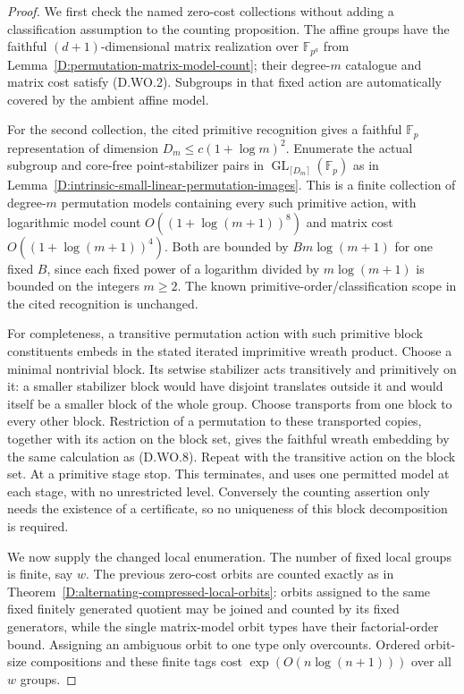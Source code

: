 \begin{proof}
We first check the named zero-cost collections without
adding a classification assumption to the counting
proposition. The affine groups have the faithful
$(d+1)$-dimensional matrix realization over
$\mathbb F_{p^a}$ from
Lemma~\ref{D:permutation-matrix-model-count}; their
degree-$m$ catalogue and matrix cost satisfy (D.WO.2).
Subgroups in that fixed action are automatically covered
by the ambient affine model.

For the second collection, the cited primitive recognition
gives a faithful $\mathbb F_p$ representation of dimension
$D_m\le c(1+\log m)^2$. Enumerate the actual subgroup
and core-free point-stabilizer pairs in
$\operatorname{GL}_{\lceil D_m\rceil}(\mathbb F_p)$
as in Lemma~\ref{D:intrinsic-small-linear-permutation-images}.
This is a finite collection of degree-$m$ permutation
models containing every such primitive action, with
logarithmic model count $O((1+\log(m+1))^8)$ and
matrix cost $O((1+\log(m+1))^4)$.
Both are bounded by $B m\log(m+1)$ for one fixed $B$,
since each fixed power of a logarithm divided by
$m\log(m+1)$ is bounded on the integers $m\ge2$.
The known primitive-order/classification scope in the
cited recognition is unchanged.

For completeness, a transitive permutation action with
such primitive block constituents embeds in the stated
iterated imprimitive wreath product. Choose a minimal
nontrivial block. Its setwise stabilizer acts transitively
and primitively on it: a smaller stabilizer block would
have disjoint translates outside it and would itself be
a smaller block of the whole group. Choose transports
from one block to every other block. Restriction of a
permutation to these transported copies, together with
its action on the block set, gives the faithful wreath
embedding by the same calculation as (D.WO.8).
Repeat with the transitive action on the block set.
At a primitive stage stop. This terminates, and uses
one permitted model at each stage, with no unrestricted
level. Conversely the counting assertion only needs the
existence of a certificate, so no uniqueness of this
block decomposition is required.

We now supply the changed local enumeration. The number
of fixed local groups is finite, say $w$. The previous
zero-cost orbits are counted exactly as in
Theorem~\ref{D:alternating-compressed-local-orbits}:
orbits assigned to the same fixed finitely generated
quotient may be joined and counted by its fixed generators,
while the single matrix-model orbit types have their
factorial-order bound. Assigning an ambiguous orbit to
one type only overcounts. Ordered orbit-size compositions
and these finite tags cost $\exp(O(n\log(n+1)))$ over
all $w$ groups.


\end{proof}
